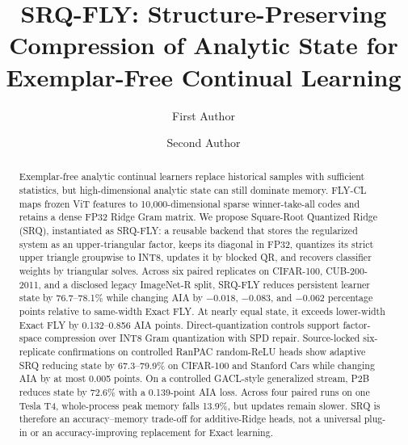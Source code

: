 \documentclass[runningheads]{llncs}
\begin{document}
\title{SRQ-FLY: Structure-Preserving Compression of Analytic State for
Exemplar-Free Continual Learning}

\author{First Author \and
Second Author}

\maketitle

\begin{abstract}
Exemplar-free analytic continual learners replace historical samples with
sufficient statistics, but high-dimensional analytic state can still dominate
memory. FLY-CL maps frozen ViT features to 10,000-dimensional sparse
winner-take-all codes and retains a dense FP32 Ridge Gram matrix. We propose
Square-Root Quantized Ridge (SRQ), instantiated as SRQ-FLY: a reusable backend
that stores the regularized system as an upper-triangular factor, keeps its
diagonal in FP32, quantizes its strict upper triangle groupwise to INT8,
updates it by blocked QR, and recovers classifier weights by triangular
solves. Across six paired replicates on CIFAR-100, CUB-200-2011, and a
disclosed legacy ImageNet-R split, SRQ-FLY reduces persistent learner state by
76.7--78.1\% while changing AIA by $-0.018$, $-0.083$, and $-0.062$
percentage points relative to same-width Exact FLY. At nearly equal state, it
exceeds lower-width Exact FLY by 0.132--0.856 AIA points. Direct-quantization
controls support factor-space compression over INT8 Gram quantization with
SPD repair. Source-locked six-replicate confirmations on controlled RanPAC
random-ReLU heads show adaptive SRQ reducing state by 67.3--79.9\% on
CIFAR-100 and Stanford Cars while changing AIA by at most 0.005 points.
On a controlled GACL-style generalized stream, P2B reduces state by 72.6\%
with a 0.139-point AIA loss.
Across four paired runs on one Tesla T4, whole-process peak memory falls
13.9\%, but updates remain slower. SRQ is therefore an accuracy--memory trade-off for additive-Ridge
heads, not a universal plug-in or an accuracy-improving replacement for Exact
learning.

\end{abstract}
\end{document}
